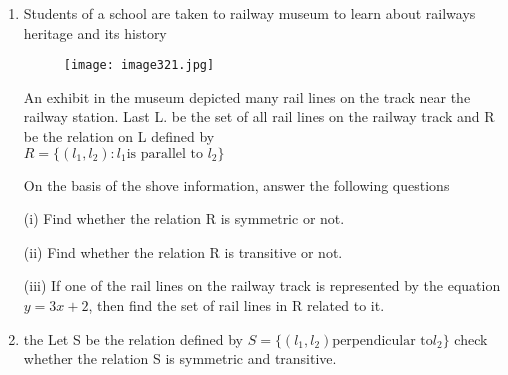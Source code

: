 \documentclass{article}
\begin{document}
\begin{enumerate}
\item Students of a school are taken to railway museum to learn about railways heritage and its history
\newpage
\begin{figure}[h!] 
\centering  
\texttt{[image: image321.jpg]} 
\label{fig:image321}                      
\end{figure}

An exhibit in the museum depicted many rail lines on the track near the railway station. Last L. be the set of all rail lines on the railway track and R be the relation on L defined by\\
$R = \{(l_1, l_2):l_1 \text{is parallel to }l_2\}$

On the basis of the shove information, answer the following questions

(i) Find whether the relation R is symmetric or not.

(ii) Find whether the relation R is transitive or not.

(iii) If one of the rail lines on the railway track is represented by the equation $y=3x+ 2$, then find the set of rail lines in R related to it.
\item the Let S be the relation defined by $ S = \{(l_1,l_2)\text{perpendicular to} l_2\}$ check whether the relation S is symmetric and transitive.
\end{enumerate}
\end{document}
